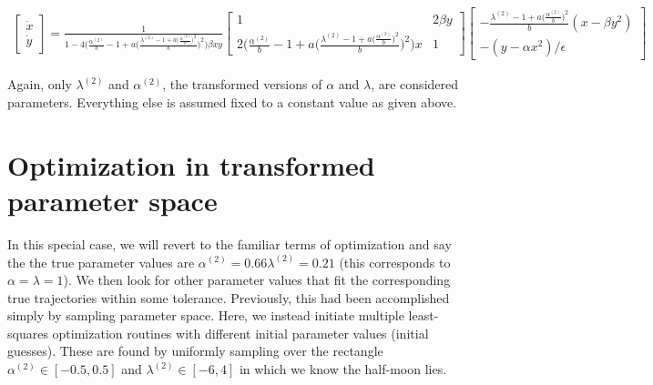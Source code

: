 \documentclass[11pt]{article}
\begin{document}
\begin{align*}
  \begin{bmatrix} \dot{x} \\ \dot{y} \end{bmatrix}  = \frac{1}{1 -
  4 \bigg( \frac{\alpha^{(2)}}{b} - 1 + a \bigg( \frac{\lambda^{(2)} - 1 + a \big(
  \frac{\alpha^{(2)}}{b} \big)^2}{b} \bigg)^2 \bigg) \beta x y} \begin{bmatrix} 1 &
2\beta y \\ 2 \bigg( \frac{\alpha^{(2)}}{b} - 1 + a \bigg( \frac{\lambda^{(2)} - 1 + a \big(
  \frac{\alpha^{(2)}}{b} \big)^2}{b} \bigg)^2 \bigg) x  &
1 \end{bmatrix} \begin{bmatrix} - \frac{\lambda^{(2)} - 1 + a \big(
  \frac{\alpha^{(2)}}{b} \big)^2}{b}(x - \beta y^2) \\ -(y - \alpha
x^2)/\epsilon \end{bmatrix} 
\end{align*}


Again, only $\lambda^{(2)}$ and $\alpha^{(2)}$, the transformed versions of $\alpha$ and
$\lambda$, are considered parameters. Everything else is assumed fixed
to a constant value as given above. \\

\section{Optimization in transformed parameter space}

In this special case, we will revert to the familiar terms of
optimization and say the the true parameter values are
$\alpha^{(2)} = 0.66 \lambda^{(2)} = 0.21$ (this corresponds to
$\alpha = \lambda = 1$). We then look for other parameter values that
fit the corresponding true trajectories within some
tolerance. Previously, this had been accomplished simply by sampling
parameter space. Here, we instead initiate multiple least-squares
optimization routines with different initial parameter values (initial
guesses). These are found by uniformly sampling over the rectangle
$\alpha^{(2)} \in [-0.5, 0.5]$ and $\lambda^{(2)} \in [-6, 4]$ in
which we know the half-moon lies. \\
\end{document}
